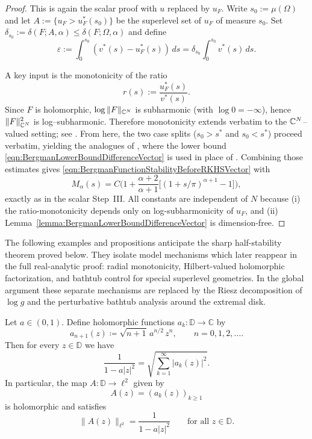 \documentclass[a4paper,10pt]{amsart}
\begin{document}
\begin{proof}
This is again the scalar proof with $u$ replaced by $u_F$.
Write $s_0:=\mu(\Omega)$ and let $A:=\{u_F>u_F^*(s_0)\}$ be the superlevel set of $u_F$ of measure $s_0$.
Set $\delta_{s_0}:=\delta(F;A,\alpha)\le \delta(F;\Omega,\alpha)$ and define
\[
\varepsilon := \int_0^{s_0}(v^*(s)-u_F^*(s))\,ds
=\delta_{s_0}\int_0^{s_0}v^*(s)\,ds.
\]

A key input is the monotonicity of the ratio
\[
r(s):=\frac{u_F^*(s)}{v^*(s)}.
\]
Since $F$ is holomorphic, $\log\|F\|_{\mathbb{C}^N}$ is subharmonic (with $\log 0=-\infty$), hence
$\|F\|_{\mathbb{C}^N}^2$ is log--subharmonic. Therefore monotonicity extends
verbatim to the $\mathbb{C}^N$--valued setting; see \cite{RamosTilli,GomezKalajMelentijevicRamos2025}.
From here, the two case splits ($s_0>s^*$ and $s_0<s^*$) proceed verbatim, yielding the analogues
of \cite[eq.3.21-eq.3.24]{GomezKalajMelentijevicRamos2025}, where the lower bound
\eqref{eqn:BergmanLowerBoundDifferenceVector} is used in place of \cite[Lemma~3.2]{GomezKalajMelentijevicRamos2025}.
Combining those estimates gives \eqref{eqn:BergmanFunctionStabilityBeforeRKHSVector} with
\[
M_\alpha(s)=C\Big(1+\frac{\alpha+2}{\alpha+1}\big[(1+s/\pi)^{\alpha+1}-1\big]\Big),
\]
exactly as in the scalar Step~III.
All constants are independent of $N$ because (i) the ratio-monotonicity depends only on
log-subharmonicity of $u_F$, and (ii) Lemma~\ref{lemma:BergmanLowerBoundDifferenceVector}
is dimension-free.
\end{proof}


 
\begin{numrem}
The following examples and propositions anticipate the sharp half-stability
theorem proved below. They isolate model mechanisms which later reappear in
the full real-analytic proof: radial monotonicity, Hilbert-valued holomorphic
factorization, and bathtub control for special superlevel geometries. In the
global argument these separate mechanisms are replaced by the Riesz
decomposition of $\log g$ and the perturbative bathtub analysis around the
extremal disk.
\end{numrem}
\begin{numexamp}\label{lem:l2factorization_radial}
Let $a\in(0,1)$. Define holomorphic functions $a_k:\mathbb D\to\mathbb C$ by
\[
a_{n+1}(z)\coloneqq \sqrt{n+1}\,a^{n/2}\,z^{n},\qquad n=0,1,2,\dots .
\]
Then for every $z\in\mathbb D$ we have
\[
\frac{1}{1-a|z|^{2}}=\sqrt{\sum_{k=1}^{\infty}\lvert a_k(z)\rvert^{2}}.
\]
In particular, the map $A:\mathbb D\to \ell^{2}$ given by 
\[
A(z)=(a_k(z))_{k\ge1}
\]
is holomorphic and satisfies
\[
\|A(z)\|_{\ell^{2}}=\frac{1}{1-a|z|^{2}}
\qquad \text{for all } z\in\mathbb D.
\]
\end{numexamp}
\end{document}
